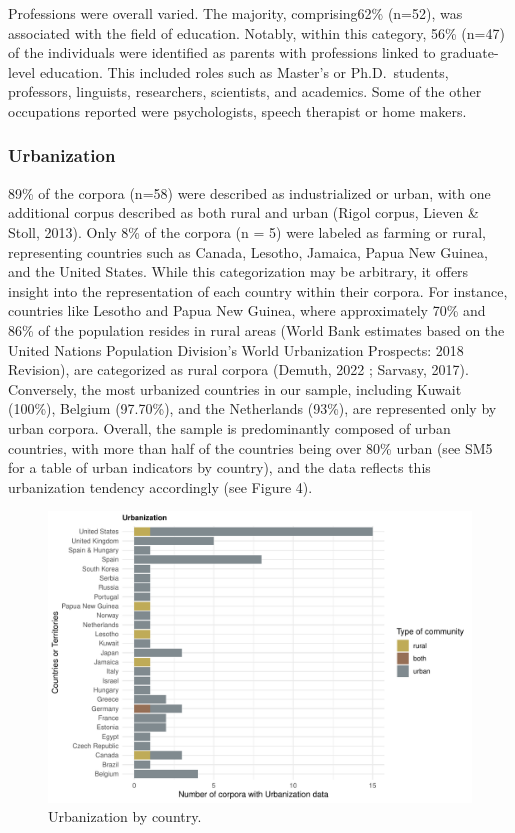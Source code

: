 \documentclass[
  man,floatsintext]{apa6}
\begin{document}
Professions were overall varied. The majority, comprising62\% (n=52), was associated with the field of education. Notably, within this category, 56\% (n=47) of the individuals were identified as parents with professions linked to graduate-level education. This included roles such as Master's or Ph.D.~students, professors, linguists, researchers, scientists, and academics. Some of the other occupations reported were psychologists, speech therapist or home makers.

\hypertarget{urbanization-1}{%
\subsubsection{Urbanization}\label{urbanization-1}}

89\% of the corpora (n=58) were described as industrialized or urban, with one additional corpus described as both rural and urban (Rigol corpus, Lieven \& Stoll, 2013). Only 8\% of the corpora (n = 5) were labeled as farming or rural, representing countries such as Canada, Lesotho, Jamaica, Papua New Guinea, and the United States. While this categorization may be arbitrary, it offers insight into the representation of each country within their corpora. For instance, countries like Lesotho and Papua New Guinea, where approximately 70\% and 86\% of the population resides in rural areas (World Bank estimates based on the United Nations Population Division's World Urbanization Prospects: 2018 Revision), are categorized as rural corpora (Demuth, 2022 ; Sarvasy, 2017). Conversely, the most urbanized countries in our sample, including Kuwait (100\%), Belgium (97.70\%), and the Netherlands (93\%), are represented only by urban corpora.
Overall, the sample is predominantly composed of urban countries, with more than half of the countries being over 80\% urban (see SM5 for a table of urban indicators by country), and the data reflects this urbanization tendency accordingly (see Figure 4).

\begin{figure}
\centering
\includegraphics{CHILDES_short_files/figure-latex/figure4-1.pdf}
\caption{\label{fig:figure4}Urbanization by country.}
\end{figure}
\end{document}
